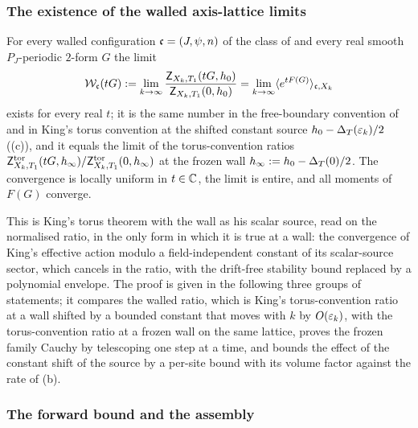 
\subsubsection*{The existence of the walled axis-lattice limits}

\begin{theorem}\label{rot:thm:H6W}
For every walled configuration $\mathfrak c=(J,\psi,n)$ of the class of  and every real smooth $P_J$-periodic $2$-form $G$ the limit
\[
\mathcal W_{\mathfrak c}(tG):=\lim_{k\to\infty}\frac{\mathsf Z_{X_k,T_1}(tG,h_0)}{\mathsf Z_{X_k,T_1}(0,h_0)}=\lim_{k\to\infty}\langle e^{tF(G)}\rangle_{\mathfrak c,X_k}
\]
exists for every real $t$; it is the same number in the free-boundary convention of  and in King's torus convention at the shifted constant source $h_0-\Delta_T(\varepsilon_k)/2$ ((c)), and it equals the limit of the torus-convention ratios $\mathsf Z^{\rm tor}_{X_k,T_1}(tG,h_\infty)/\mathsf Z^{\rm tor}_{X_k,T_1}(0,h_\infty)$ at the frozen wall $h_\infty:= h_0-\Delta_T(0)/2$. The convergence is locally uniform in $t\in\mathbb C$, the limit is entire, and all moments of $F(G)$ converge.
\end{theorem}

This is King's torus theorem \cite[Thm.~2.1]{K1} with the wall as his scalar source, read on the normalised ratio, in the only form in which it is true at a wall: the convergence of King's effective action \cite[Thm.~3.4]{K1} modulo a field-independent constant of its scalar-source sector, which cancels in the ratio, with the drift-free stability bound \cite[(2.23)]{K1} replaced by a polynomial envelope. The proof is given in the following three groups of statements; it compares the walled ratio, which is King's torus-convention ratio at a wall shifted by a bounded constant that moves with $k$ by $O(\varepsilon_k)$, with the torus-convention ratio at a frozen wall on the same lattice, proves the frozen family Cauchy by telescoping one step at a time, and bounds the effect of the constant shift of the source by a per-site bound with its volume factor against the rate of (b).





\subsubsection*{The forward bound and the assembly}

